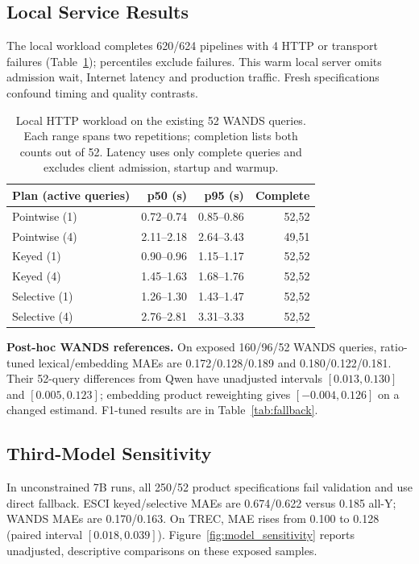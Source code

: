 \documentclass[conference]{IEEEtran}
\begin{document}
\subsection{Local Service Results}
The local workload completes 620/624 pipelines with 4 HTTP or transport failures (Table~\ref{tab:local_service}); percentiles exclude failures. This warm local server omits admission wait, Internet latency and production traffic. Fresh specifications confound timing and quality contrasts.

\begin{table}[t]
\caption{Local HTTP workload on the existing 52 WANDS queries. Each range spans two repetitions; completion lists both counts out of 52. Latency uses only complete queries and excludes client admission, startup and warmup.}
\label{tab:local_service}
\centering\footnotesize
\begin{tabular}{lrrr}
\toprule
Plan (active queries) & p50 (s) & p95 (s) & Complete \\
\midrule
Pointwise (1) & 0.72--0.74 & 0.85--0.86 & 52,52 \\
Pointwise (4) & 2.11--2.18 & 2.64--3.43 & 49,51 \\
Keyed (1) & 0.90--0.96 & 1.15--1.17 & 52,52 \\
Keyed (4) & 1.45--1.63 & 1.68--1.76 & 52,52 \\
Selective (1) & 1.26--1.30 & 1.43--1.47 & 52,52 \\
Selective (4) & 2.76--2.81 & 3.31--3.33 & 52,52 \\
\bottomrule
\end{tabular}
\end{table}

\textbf{Post-hoc WANDS references.} On exposed 160/96/52 WANDS queries, ratio-tuned lexical/embedding MAEs are 0.172/0.128/0.189 and 0.180/0.122/0.181. Their 52-query differences from Qwen have unadjusted intervals $[0.013,0.130]$ and $[0.005,0.123]$; embedding product reweighting gives $[-0.004,0.126]$ on a changed estimand. F1-tuned results are in Table~\ref{tab:fallback}.

\subsection{Third-Model Sensitivity}
In unconstrained 7B runs, all 250/52 product specifications fail validation and use direct fallback. ESCI keyed/selective MAEs are 0.674/0.622 versus 0.185 all-Y; WANDS MAEs are 0.170/0.163. On TREC, MAE rises from 0.100 to 0.128 (paired interval $[0.018,0.039]$). Figure~\ref{fig:model_sensitivity} reports unadjusted, descriptive comparisons on these exposed samples.
\end{document}
